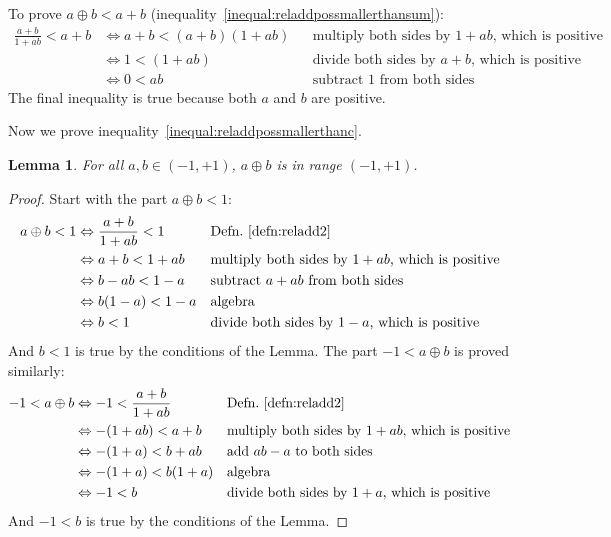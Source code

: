 \documentclass[a4paper]{article}
\theoremstyle{plain}
\newtheorem{lemma}[theorem]{Lemma}
\theoremstyle{definition}
\begin{document}
To prove $a \oplus b < a+b$
(inequality~\eqref{inequal:reladdpossmallerthansum}):
\begin{align*}
\frac{a+b}{1+ab} < a+b
  & \Leftrightarrow a+b < (a+b)(1+ab) & & \text{multiply both sides by $1+ab$, which is positive} \\
  & \Leftrightarrow 1 < (1+ab) & & \text{divide both sides by $a+b$, which is positive} \\
  & \Leftrightarrow 0 < ab & & \text{subtract 1 from both sides}
\end{align*}
The final inequality is true because both $a$ and $b$ are positive.

Now we prove inequality~\eqref{inequal:reladdpossmallerthanc}.
\begin{lemma}
\label{lem:1dRelVelAddClosure}
For all $a, b \in (-1, +1)$, $a \oplus b$ is in range $(-1, +1)$.
\end{lemma}

\begin{proof}
Start with the part $a \oplus b < 1$:
\begin{align*}
a \oplus b < 1
  & \Leftrightarrow \frac{a+b}{1+ab} < 1 & & \text{Defn.~\eqref{defn:reladd2}} \\
  & \Leftrightarrow a+b < 1+ab & & \text{multiply both sides by $1+ab$, which is positive} \\
  & \Leftrightarrow b-ab < 1-a & & \text{subtract $a+ab$ from both sides} \\
  & \Leftrightarrow b(1-a) < 1-a & & \text{algebra} \\
  & \Leftrightarrow b < 1 & & \text{divide both sides by $1-a$, which is positive}
\end{align*}
And $ b < 1$ is true by the conditions of the Lemma.
The part $-1 < a \oplus b$ is proved similarly:
\begin{align*}
-1 < a \oplus b
  & \Leftrightarrow -1 < \frac{a+b}{1+ab} & & \text{Defn.~\eqref{defn:reladd2}} \\
  & \Leftrightarrow -(1+ab) < a+b & & \text{multiply both sides by $1+ab$, which is positive} \\
  & \Leftrightarrow -(1+a) < b+ab & & \text{add $ab-a$ to both sides} \\
  & \Leftrightarrow -(1+a) < b(1+a) & & \text{algebra} \\
  & \Leftrightarrow -1 < b & & \text{divide both sides by $1+a$, which is positive}
\end{align*}
And $-1 < b$ is true by the conditions of the Lemma.
\end{proof}
\end{document}
